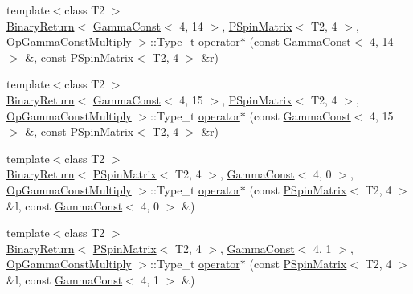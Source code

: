 \begin{DoxyCompactItemize}
\item 
{\footnotesize template$<$class T2 $>$ }\\\mbox{\hyperlink{structENSEM_1_1BinaryReturn}{Binary\+Return}}$<$ \mbox{\hyperlink{classENSEM_1_1GammaConst}{Gamma\+Const}}$<$ 4, 14 $>$, \mbox{\hyperlink{classENSEM_1_1PSpinMatrix}{P\+Spin\+Matrix}}$<$ T2, 4 $>$, \mbox{\hyperlink{structENSEM_1_1OpGammaConstMultiply}{Op\+Gamma\+Const\+Multiply}} $>$\+::Type\+\_\+t \mbox{\hyperlink{group__primspinmatrix_ga8b0118f0d96b78f8fbea926daf66af8f}{operator$\ast$}} (const \mbox{\hyperlink{classENSEM_1_1GammaConst}{Gamma\+Const}}$<$ 4, 14 $>$ \&, const \mbox{\hyperlink{classENSEM_1_1PSpinMatrix}{P\+Spin\+Matrix}}$<$ T2, 4 $>$ \&r)
\item 
{\footnotesize template$<$class T2 $>$ }\\\mbox{\hyperlink{structENSEM_1_1BinaryReturn}{Binary\+Return}}$<$ \mbox{\hyperlink{classENSEM_1_1GammaConst}{Gamma\+Const}}$<$ 4, 15 $>$, \mbox{\hyperlink{classENSEM_1_1PSpinMatrix}{P\+Spin\+Matrix}}$<$ T2, 4 $>$, \mbox{\hyperlink{structENSEM_1_1OpGammaConstMultiply}{Op\+Gamma\+Const\+Multiply}} $>$\+::Type\+\_\+t \mbox{\hyperlink{group__primspinmatrix_gaf61c9e0fced9fe43e7016043fadb4e98}{operator$\ast$}} (const \mbox{\hyperlink{classENSEM_1_1GammaConst}{Gamma\+Const}}$<$ 4, 15 $>$ \&, const \mbox{\hyperlink{classENSEM_1_1PSpinMatrix}{P\+Spin\+Matrix}}$<$ T2, 4 $>$ \&r)
\item 
{\footnotesize template$<$class T2 $>$ }\\\mbox{\hyperlink{structENSEM_1_1BinaryReturn}{Binary\+Return}}$<$ \mbox{\hyperlink{classENSEM_1_1PSpinMatrix}{P\+Spin\+Matrix}}$<$ T2, 4 $>$, \mbox{\hyperlink{classENSEM_1_1GammaConst}{Gamma\+Const}}$<$ 4, 0 $>$, \mbox{\hyperlink{structENSEM_1_1OpGammaConstMultiply}{Op\+Gamma\+Const\+Multiply}} $>$\+::Type\+\_\+t \mbox{\hyperlink{group__primspinmatrix_ga55a6793cedfea5afc1bafa2c470d0350}{operator$\ast$}} (const \mbox{\hyperlink{classENSEM_1_1PSpinMatrix}{P\+Spin\+Matrix}}$<$ T2, 4 $>$ \&l, const \mbox{\hyperlink{classENSEM_1_1GammaConst}{Gamma\+Const}}$<$ 4, 0 $>$ \&)
\item 
{\footnotesize template$<$class T2 $>$ }\\\mbox{\hyperlink{structENSEM_1_1BinaryReturn}{Binary\+Return}}$<$ \mbox{\hyperlink{classENSEM_1_1PSpinMatrix}{P\+Spin\+Matrix}}$<$ T2, 4 $>$, \mbox{\hyperlink{classENSEM_1_1GammaConst}{Gamma\+Const}}$<$ 4, 1 $>$, \mbox{\hyperlink{structENSEM_1_1OpGammaConstMultiply}{Op\+Gamma\+Const\+Multiply}} $>$\+::Type\+\_\+t \mbox{\hyperlink{group__primspinmatrix_gaf4a854dbb554a35d450e52f9edaae13e}{operator$\ast$}} (const \mbox{\hyperlink{classENSEM_1_1PSpinMatrix}{P\+Spin\+Matrix}}$<$ T2, 4 $>$ \&l, const \mbox{\hyperlink{classENSEM_1_1GammaConst}{Gamma\+Const}}$<$ 4, 1 $>$ \&)

\end{DoxyCompactItemize}
